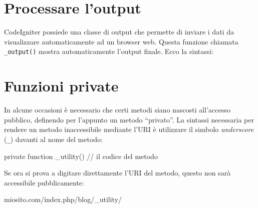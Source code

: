 \section*{Processare l'output}
CodeIgniter possiede una classe di output che permette di inviare i dati da visualizzare automaticamente ad un browser web. Questa funzione chiamata \verb|_output()| mostra automaticamente l'output finale. Ecco la sintassi:


%

\section*{Funzioni private}
In alcune occasioni è necessario che certi metodi siano nascosti all'accesso pubblico, definendo per l'appunto un metodo ``privato''. La sintassi necessaria per rendere un metodo inaccessibile mediante l'\ac{URI} è utilizzare il simbolo \emph{underscore} (\verb|_|) davanti al nome del metodo:

\begin{code}
private function _utility()
{
  // il codice del metodo
}
\end{code}

Se ora si prova a digitare direttamente l'\ac{URI} del metodo, questo non sarà accessibile pubblicamente:

\begin{code}
miosito.com/index.php/blog/_utility/
\end{code}

